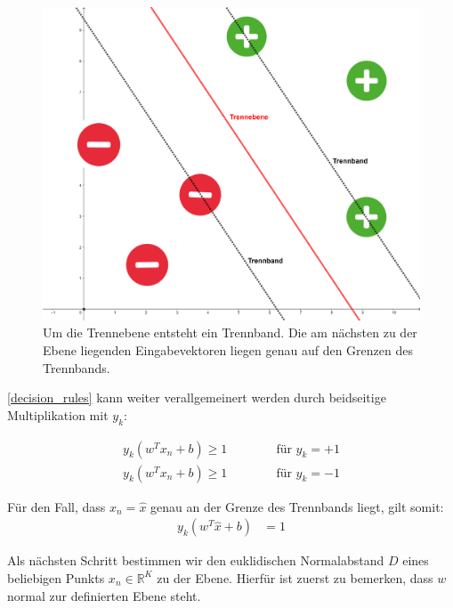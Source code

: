 \documentclass[a4paper,11pt,twoside]{scrreprt}
\begin{document}
\begin{figure}[H]
	\centering
	\includegraphics[width = 12cm]{assets/trennband.png}
	\caption{Um die Trennebene entsteht ein Trennband. Die am nächsten zu der Ebene liegenden Eingabevektoren liegen genau auf den Grenzen des Trennbands.}
	\label{fig:trennband}
\end{figure}



 \autoref{decision_rules} kann weiter verallgemeinert werden durch beidseitige Multiplikation mit $y_{k}$:

\begin{subequations} \label{decision_rules2}
	\begin{alignat}{2}
		y_{k} (w^{T} x_{n} + b) \geq 1 & \qquad & \text{ für } y_{k} = +1\\
		y_{k} (w^{T} x_{n} + b) \geq 1 & & \text{ für } y_{k} = -1
	\end{alignat}
\end{subequations}



Für den Fall, dass $x_{n} = \hat{x}$ genau an der Grenze des Trennbands liegt, gilt somit:
\begin{equation} \label{dec_rule}
	\begin{aligned}
		y_{k} (w^{T} \hat{x} + b) &= 1
	\end{aligned}
\end{equation}


Als nächsten Schritt bestimmen wir den euklidischen Normalabstand $D$ eines beliebigen Punkts $x_{n} \in \mathbb{R}^{K}$ zu der Ebene. Hierfür ist zuerst zu bemerken, dass $w$ normal zur definierten Ebene steht.
\end{document}
